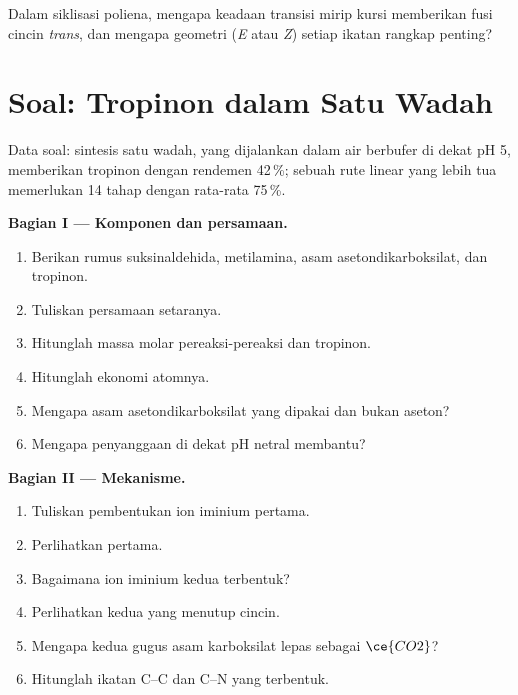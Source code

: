 \begin{exercise}[$\star\star\star$]\label{exo:b3:total-synthesis:12}
Dalam siklisasi poliena, mengapa keadaan transisi mirip kursi memberikan fusi cincin
\textit{trans}, dan mengapa geometri (\textit{E} atau \textit{Z}) setiap ikatan rangkap penting?
\end{exercise}

\section{Soal: Tropinon dalam Satu Wadah}

\begin{problem}
\label{pb:b3:total-synthesis:1}
Data soal: sintesis satu wadah, yang dijalankan dalam air berbufer di dekat pH 5,
memberikan tropinon dengan rendemen 42\,\%; sebuah rute linear yang lebih tua memerlukan 14 tahap dengan rata-rata 75\,\%.

\medskip\noindent\textbf{Bagian I --- Komponen dan persamaan.}
\begin{enumerate}[beginpenalty=10000]
  \item Berikan rumus suksinaldehida, metilamina, asam asetondikarboksilat,
        dan tropinon.
  \item Tuliskan persamaan setaranya.
  \item Hitunglah massa molar pereaksi-pereaksi dan tropinon.
  \item Hitunglah ekonomi atomnya.
  \item Mengapa asam asetondikarboksilat yang dipakai dan bukan aseton?
  \item Mengapa penyanggaan di dekat pH netral membantu?
\end{enumerate}

\medskip\noindent\textbf{Bagian II --- Mekanisme.}
\begin{enumerate}[resume, beginpenalty=10000]
  \item Tuliskan pembentukan ion iminium pertama.
  \item Perlihatkan  pertama.
  \item Bagaimana ion iminium kedua terbentuk?
  \item Perlihatkan  kedua yang menutup cincin.
  \item Mengapa kedua gugus asam karboksilat lepas sebagai $\ce{CO2}$?
  \item Hitunglah ikatan C--C dan C--N yang terbentuk.
\end{enumerate}


\end{problem}
